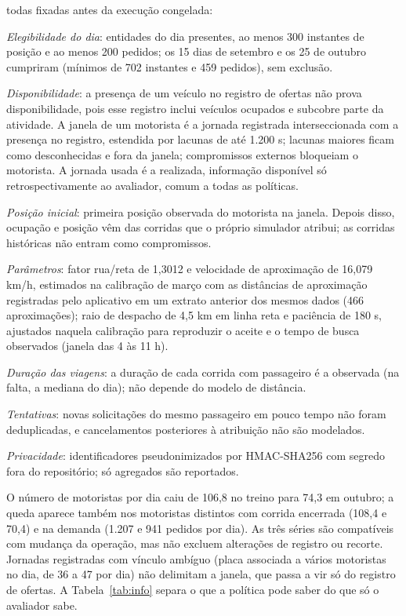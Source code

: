 todas fixadas antes da execução congelada:
\begin{alineas}
\item \textit{Elegibilidade do dia}: entidades do dia presentes, ao menos 300 instantes de posição e ao menos 200 pedidos; os 15 dias de setembro e os 25 de outubro cumpriram (mínimos de 702 instantes e 459 pedidos), sem exclusão.
\item \textit{Disponibilidade}: a presença de um veículo no registro de ofertas não prova disponibilidade, pois esse registro inclui veículos ocupados e subcobre parte da atividade. A janela de um motorista é a jornada registrada interseccionada com a presença no registro, estendida por lacunas de até 1.200 s; lacunas maiores ficam como desconhecidas e fora da janela; compromissos externos bloqueiam o motorista. A jornada usada é a realizada, informação disponível só retrospectivamente ao avaliador, comum a todas as políticas.
\item \textit{Posição inicial}: primeira posição observada do motorista na janela. Depois disso, ocupação e posição vêm das corridas que o próprio simulador atribui; as corridas históricas não entram como compromissos.
\item \textit{Parâmetros}: fator rua/reta de 1,3012 e velocidade de aproximação de 16,079 km/h, estimados na calibração de março com as distâncias de aproximação registradas pelo aplicativo em um extrato anterior dos mesmos dados (466 aproximações); raio de despacho de 4,5 km em linha reta e paciência de 180 s, ajustados naquela calibração para reproduzir o aceite e o tempo de busca observados (janela das 4 às 11 h).
\item \textit{Duração das viagens}: a duração de cada corrida com passageiro é a observada (na falta, a mediana do dia); não depende do modelo de distância.
\item \textit{Tentativas}: novas solicitações do mesmo passageiro em pouco tempo não foram deduplicadas, e cancelamentos posteriores à atribuição não são modelados.
\item \textit{Privacidade}: identificadores pseudonimizados por HMAC-SHA256 com segredo fora do repositório; só agregados são reportados.
\end{alineas}

O número de motoristas por dia caiu de 106,8 no treino para 74,3 em outubro; a queda aparece também nos motoristas distintos com corrida encerrada (108,4 e 70,4) e na demanda (1.207 e 941 pedidos por dia). As três séries são compatíveis com mudança da operação, mas não excluem alterações de registro ou recorte. Jornadas registradas com vínculo ambíguo (placa associada a vários motoristas no dia, de 36 a 47 por dia) não delimitam a janela, que passa a vir só do registro de ofertas. A Tabela~\ref{tab:info} separa o que a política pode saber do que só o avaliador sabe.


